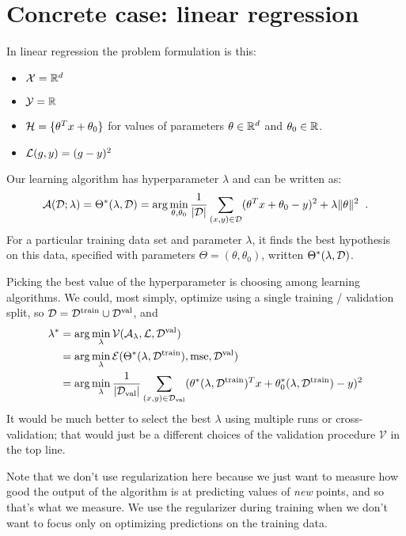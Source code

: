 \section{Concrete case: linear regression}
In linear regression the problem formulation is this:
\begin{itemize}
  \item $\mathcal{X} = \mathbb{R}^d$
  \item $\mathcal{Y} = \mathbb{R}$
  \item ${\cal H} = \{\theta^T x + \theta_0\}$ for values of
        parameters $\theta \in \mathbb{R}^d$ and $\theta_0 \in \mathbb{R}$.
  \item $\mathcal{L}(g, y) = (g - y)^2$
\end{itemize}

Our learning algorithm has hyperparameter $\lambda$ and can be written
as:
\[\mathcal{A}({\cal D}; \lambda) = \Theta^*(\lambda, {\cal D}) = {\rm arg}\min_{\theta, \theta_0}
  \frac{1}{|{\cal D}|} \sum_{(x, y) \in {\cal D}} (\theta^Tx +
  \theta_0 - y)^2 + \lambda\|\theta\|^2 \;\;.\]
For a particular training data set and parameter $\lambda$, it finds
the best hypothesis on this data, specified with parameters $\Theta =
  (\theta, \theta_0)$, written  $\Theta^*(\lambda, {\cal D})$.

Picking the best value of the hyperparameter is choosing among
learning algorithms. We could, most simply,
optimize using a single training / validation split, so ${\cal D} =
  {\cal D}^\text{train} \cup {\cal D}^\text{val}$, and
\begin{align*}
  \lambda^* & = {\rm arg}\min_{\lambda} \mathcal{V}(\mathcal{A}_\lambda, \mathcal{L},
  {\cal D}^\text{val})                                                                             \\
            & = {\rm arg}\min_{\lambda} \mathcal{E}(\Theta^*(\lambda, {\cal D}^\text{train}), \text{mse},
  {\cal D}^\text{val})                                                                             \\
            & = {\rm arg}\min_{\lambda} \frac{1}{|{\cal D}_\text{val}|} \sum_{(x, y) \in
  {\cal D}_\text{val}} (\theta^*(\lambda, {\cal D}^\text{train})^T x +
  \theta^*_0(\lambda, {\cal D}^\text{train}) - y)^2
\end{align*}
It would be much better to select the best $\lambda$ using multiple
runs or cross-validation;  that would just be a different choices of
the validation procedure $\mathcal{V}$ in the top line.

Note that we don't use regularization here because we just want to measure how good the
output of the algorithm is at predicting values of {\em new} points,
and so that's what we measure.   We use the regularizer during
training when we don't want to focus only on optimizing predictions on
the training data.

